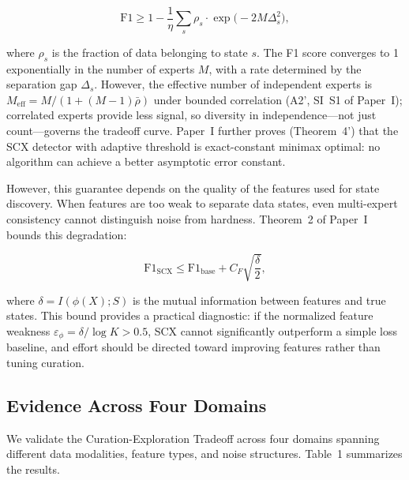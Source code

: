 \documentclass[12pt,a4paper]{article}
\begin{document}
\begin{equation}
\mathrm{F1} \geq 1 - \frac{1}{\eta} \sum_{s} \rho_s \cdot \exp\!\bigl(-2M\Delta_s^2\bigr),
\end{equation}

where $\rho_s$ is the fraction of data belonging to state $s$. The F1 score converges to 1 exponentially in the number of experts $M$, with a rate determined by the separation gap $\Delta_s$. However, the effective number of independent experts is $M_{\text{eff}} = M/(1+(M-1)\bar{\rho})$ under bounded correlation (A2', SI~S1 of Paper~I); correlated experts provide less signal, so diversity in independence---not just count---governs the tradeoff curve. Paper~I further proves (Theorem~4') that the SCX detector with adaptive threshold is exact-constant minimax optimal: no algorithm can achieve a better asymptotic error constant.

However, this guarantee depends on the quality of the features used for state discovery. When features are too weak to separate data states, even multi-expert consistency cannot distinguish noise from hardness. Theorem~2 of Paper~I bounds this degradation:

\begin{equation}
\mathrm{F1}_{\mathrm{SCX}} \leq \mathrm{F1}_{\mathrm{base}} + C_F \sqrt{\frac{\delta}{2}},
\end{equation}

where $\delta = I(\phi(X); S)$ is the mutual information between features and true states. This bound provides a practical diagnostic: if the normalized feature weakness $\varepsilon_\phi = \delta / \log K > 0.5$, SCX cannot significantly outperform a simple loss baseline, and effort should be directed toward improving features rather than tuning curation.

\subsection{Evidence Across Four Domains}

We validate the Curation-Exploration Tradeoff across four domains spanning different data modalities, feature types, and noise structures. Table~1 summarizes the results.
\end{document}
